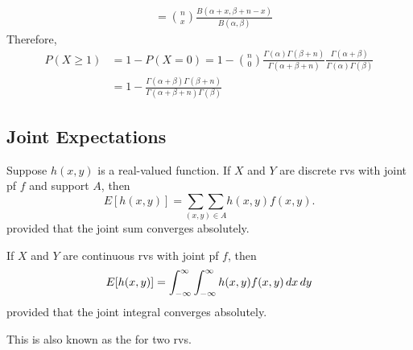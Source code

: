 \documentclass[notoc,notitlepage]{tufte-book}
\begin{document}
\begin{eg}[Example 3.15]
\begin{solution}
\begin{align*}
           &= \binom{n}{x} \frac{B( \alpha + x, \beta + n - x )}{B( \alpha, \beta )}
    \end{align*}
    Therefore,
    \begin{align*}
      P(X \geq 1) &= 1 - P(X = 0) = 1 - \binom{n}{0} \frac{\Gamma(\alpha)\Gamma(\beta + n)}{\Gamma( \alpha + \beta + n )} \frac{\Gamma( \alpha + \beta )}{\Gamma(\alpha) \Gamma(\beta)} \\
        &= 1 - \frac{\Gamma(\alpha + \beta) \Gamma(\beta + n)}{\Gamma( \alpha + \beta + n ) \Gamma(\beta)}
    \end{align*}
  \end{solution}
\end{eg}


\subsection{Joint Expectations}%
\label{sub:joint_expectations}

\begin{defn}
\label{defn:joint_expectation}
  Suppose $h(x, y)$ is a real-valued function. If $X$ and $Y$ are discrete rvs with joint pf $f$ and support $A$, then
  \begin{equation*}
    E[ h(x, y) ] = \underset{(x, y) \in A}{\sum\sum} h(x, y) f(x, y).
  \end{equation*}
  provided that the joint sum converges absolutely.

  If $X$ and $Y$ are continuous rvs with joint pf $f$, then
  \begin{equation*}
    E[ h(x, y) ] = \int_{-\infty}^{\infty} \int_{-\infty}^{\infty} h(x, y) f(x, y) \mathop{}\!d{x} \mathop{}\!d{y}
  \end{equation*}
  provided that the joint integral converges absolutely.

  This is also known as the  for two rvs.
\end{defn}
\end{document}

